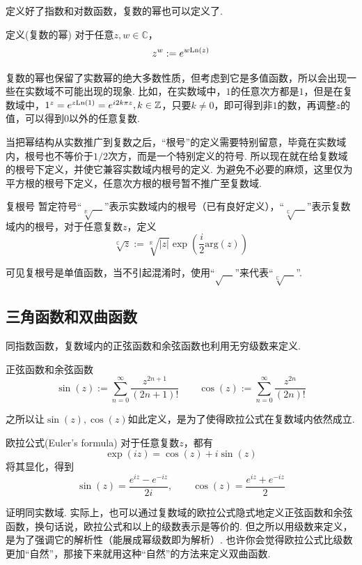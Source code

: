 定义好了指数和对数函数，复数的幂也可以定义了. 
\begin{definition}{定义(复数的幂)}
    对于任意\(z,w \in \mathbb{C}\)，
    \[z^w := e^{w{\rm Ln}(z)}\]
\end{definition}

复数的幂也保留了实数幂的绝大多数性质，但考虑到它是多值函数，所以会出现一些在实数域不可能出现的现象. 比如，在实数域中，\(1\)的任意次方都是\(1\)，但是在复数域中，\(1^z = e^{z{\rm Ln}(1)} = e^{i2k\pi z}, k \in \mathbb{Z}\)，只要\(k \neq  0\)，即可得到非\(1\)的数，再调整\(z\)的值，可以得到\(0\)以外的任意复数.

当把幂结构从实数推广到复数之后，“根号”的定义需要特别留意，毕竟在实数域内，根号也不等价于\(1/2\)次方，而是一个特别定义的符号. 所以现在就在给复数域的根号下定义，并使它兼容实数域内根号的定义. 为避免不必要的麻烦，这里仅为平方根的根号下定义，任意次方根的根号暂不推广至复数域.

\begin{definition}{复根号}
    暂定符号“\(\sqrt[\mathbb{R}]{\quad}\)”表示实数域内的根号（已有良好定义），“\(\sqrt[\mathbb{C}]{\quad}\)”表示复数域内的根号，对于任意复数\(z\)，定义
    \[\sqrt[\mathbb{C}]{z} := \sqrt[\mathbb{R}]{|z|}\exp\left(\frac{i}{2}\mathrm{arg}(z)\right)\]
\end{definition}
可见复根号是单值函数，当不引起混淆时，使用“\(\sqrt{\quad}\)”来代表“\(\sqrt[\mathbb{C}]{\quad}\)”.

\subsection{三角函数和双曲函数}

同指数函数，复数域内的正弦函数和余弦函数也利用无穷级数来定义.

\begin{definition}{正弦函数和余弦函数}
    \[\sin(z) := \sum_{n=0}^{\infty}\frac{z^{2n+1}}{(2n+1)!} \qquad \cos(z) := \sum_{n=0}^{\infty}\frac{z^{2n}}{(2n)!} \]
\end{definition}

之所以让\(\sin(z),\cos(z)\)如此定义，是为了使得欧拉公式在复数域内依然成立.

\begin{theorem}{欧拉公式(Euler's formula)}
    对于任意复数\(z\)，都有
    \[\exp(iz)=\cos(z)+i\sin(z)\]
    将其显化，得到
    \[\sin(z) = \frac{e^{iz}-e^{-iz}}{2i}, \qquad \cos(z) = \frac{e^{iz}+e^{-iz}}{2}\]
\end{theorem}
证明同实数域. 实际上，也可以通过复数域的欧拉公式隐式地定义正弦函数和余弦函数，换句话说，欧拉公式和以上的级数表示是等价的. 但之所以用级数来定义，是为了强调它的解析性（能展成幂级数即为解析）. 也许你会觉得欧拉公式比级数更加“自然”，那接下来就用这种“自然”的方法来定义双曲函数.

